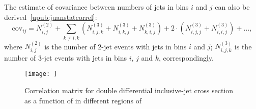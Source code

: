 The estimate of covariance between numbers of jets in bins $i$ and $j$ can also be derived~\ref{upub:juanstatcorrel}:
\begin{equation}
 \mathrm{cov}_{ij} = N_{i,j}^{\left(2\right)} + \sum_{k\neq i,k}{\left(N_{i,j,k}^{\left(3\right)} + N_{i,k,j}^{\left(3\right)} + N_{k,i,j}^{\left(3\right)} \right) + 2\cdot\left( N_{i,j,j}^{\left(3\right)} + N_{i,i,j}^{\left(3\right)} \right) + \ldots },
 \label{eq:covmultipoisson}
\end{equation}
where $N_{i,j}^{\left(2\right)}$ is the number of 2-jet events with jets in bins $i$ and $j$; $N_{i,j,k}^{\left(3\right)}$ is the number of 3-jet events with jets in bins $i$, $j$ and $k$, correspondingly.

\begin{figure}
	\centering
		\texttt{[image: ]}
	\caption{Correlation matrix for double differential inclusive-jet cross section as a function of \etjetb in different regions of \qsq}
	\label{fig:correlmatrix}
\end{figure}
